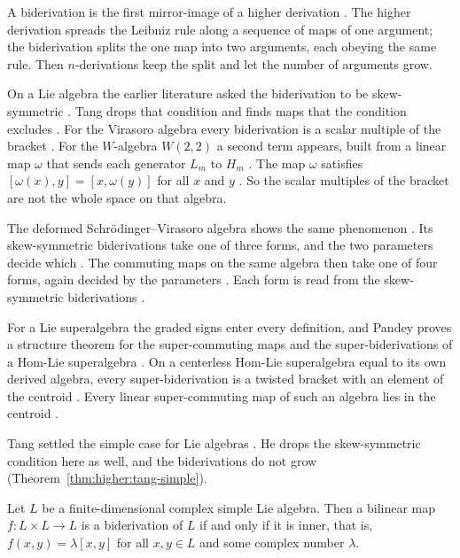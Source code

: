 A biderivation is the first mirror-image of a higher derivation
\cite[p.~2323]{FerreroHaetinger2002}. The higher derivation spreads the
Leibniz rule along a sequence of maps of one argument; the biderivation
splits the one map into two arguments, each obeying the same rule.
Then $n$-derivations keep the split and let the number of arguments grow.

On a Lie algebra the earlier literature asked the biderivation to be
skew-symmetric \cite[p.~1]{Tang2016W22}. Tang drops that condition and finds
maps that the condition excludes \cite[p.~1]{Tang2016W22}. For the Virasoro
algebra every biderivation is a scalar multiple of the bracket
\cite[Theorem~3.1, p.~7]{Tang2016W22}. For the $W$-algebra $W(2,2)$ a second
term appears, built from a linear map $\omega$ that sends each generator $L_m$
to $H_m$ \cite[Theorem~2.6, p.~7]{Tang2016W22}.
The map $\omega$ satisfies $[\omega(x),y]=[x,\omega(y)]$ for all $x$ and $y$
\cite[p.~6]{Tang2016W22}. So the scalar multiples of the bracket are not the
whole space on that algebra.

The deformed Schr\"odinger--Virasoro algebra shows the same phenomenon
\cite[p.~1]{FanSuXu2016}. Its skew-symmetric biderivations take one of three
forms, and the two parameters decide which
\cite[Theorem~3.2, p.~4]{FanSuXu2016}. The commuting maps on the same algebra
then take one of four forms, again decided by the parameters
\cite[Theorem~4.3, p.~11]{FanSuXu2016}. Each form is read from the
skew-symmetric biderivations \cite[p.~1]{FanSuXu2016}.

For a Lie superalgebra the graded signs enter every definition, and Pandey
proves a structure theorem for the super-commuting maps and the
super-biderivations of a Hom-Lie superalgebra
\cite[p.~1]{Pandey2024Superbiderivations}. On a centerless Hom-Lie
superalgebra equal to its own derived algebra, every super-biderivation is a
twisted bracket with an element of the centroid \cite[Theorem~3.8,
p.~7]{Pandey2024Superbiderivations}. Every linear super-commuting map of such
an algebra lies in the centroid \cite[Theorem~4.2,
p.~11]{Pandey2024Superbiderivations}.

Tang settled the simple case for Lie algebras
\cite[p.~1]{Tang2017Biderivations}. He drops the skew-symmetric condition here
as well, and the biderivations do not grow
(Theorem~\ref{thm:higher:tang-simple}).

\begin{theorem}\label{thm:higher:tang-simple}
Let $L$ be a finite-dimensional complex simple Lie algebra. Then a bilinear map
$f\colon L\times L\to L$ is a biderivation of $L$ if and only if it is inner, that
is, $f(x,y)=\lambda[x,y]$ for all $x,y\in L$ and some complex number $\lambda$.
\end{theorem}

